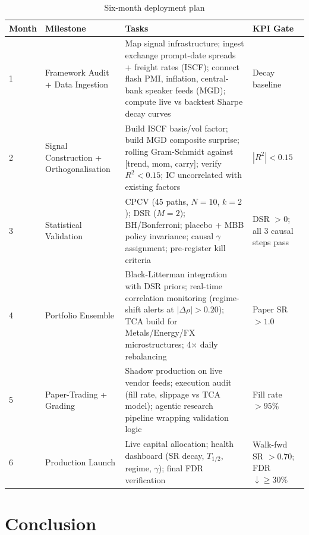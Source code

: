 \documentclass[11pt]{article}
\begin{document}
\begin{table}[h]
\centering
\caption{Six-month deployment plan}
\small
\begin{tabular}{p{0.6cm}p{2.7cm}p{7.2cm}p{2.5cm}}
\toprule
Month & Milestone & Tasks & KPI Gate \\
\midrule
1 & Framework Audit + Data Ingestion & Map signal infrastructure; ingest exchange prompt-date spreads + freight rates (ISCF); connect flash PMI, inflation, central-bank speaker feeds (MGD); compute live vs backtest Sharpe decay curves & Decay baseline \\
2 & Signal Construction + Orthogonalisation & Build ISCF basis/vol factor; build MGD composite surprise; rolling Gram-Schmidt against [trend, mom, carry]; verify $R^2 < 0.15$; IC uncorrelated with existing factors & $|R^2| < 0.15$ \\
3 & Statistical Validation & CPCV (45 paths, $N{=}10$, $k{=}2$); DSR ($M{=}2$); BH/Bonferroni; placebo + MBB policy invariance; causal $\gamma$ assignment; pre-register kill criteria & DSR $> 0$; all 3 causal steps pass \\
4 & Portfolio Ensemble & Black-Litterman integration with DSR priors; real-time correlation monitoring (regime-shift alerts at $|\Delta\rho| > 0.20$); TCA build for Metals/Energy/FX microstructures; 4$\times$ daily rebalancing & Paper SR $> 1.0$ \\
5 & Paper-Trading + Grading & Shadow production on live vendor feeds; execution audit (fill rate, slippage vs TCA model); agentic research pipeline wrapping validation logic & Fill rate $> 95\%$ \\
6 & Production Launch & Live capital allocation; health dashboard (SR decay, $T_{1/2}$, regime, $\gamma$); final FDR verification & Walk-fwd SR $> 0.70$; FDR $\downarrow \geq 30\%$ \\
\bottomrule
\end{tabular}
\end{table}

\section{Conclusion}
\end{document}

